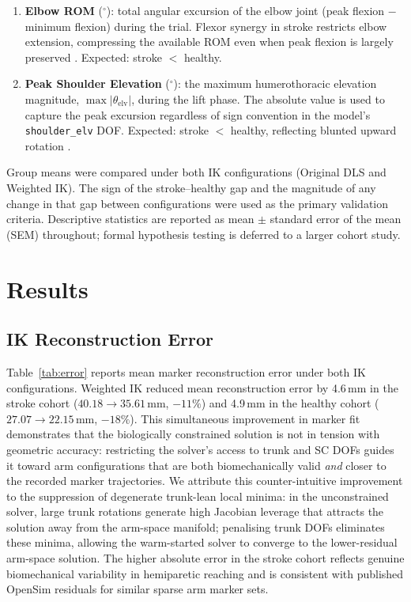 \documentclass[journal,10pt,twocolumn]{IEEEtran}
\begin{document}
\begin{enumerate}
  \item \textbf{Elbow ROM} ($^{\circ}$): total angular excursion of the
        elbow joint (peak flexion $-$ minimum flexion) during the trial.
        Flexor synergy in stroke restricts elbow extension, compressing
        the available ROM even when peak flexion is largely preserved
        \cite{dewald1995}.
        Expected: stroke $<$ healthy.

  \item \textbf{Peak Shoulder Elevation} ($^{\circ}$): the maximum
        humerothoracic elevation magnitude, $\max|\theta_{\text{elv}}|$,
        during the lift phase. The absolute value is used to capture the
        peak excursion regardless of sign convention in the model's
        \texttt{shoulder\_elv} DOF.
        Expected: stroke $<$ healthy, reflecting blunted upward rotation
        \cite{wagner2007}.
\end{enumerate}

Group means were compared under both IK configurations (Original DLS and
Weighted IK). The sign of the stroke--healthy gap and the magnitude of
any change in that gap between configurations were used as the primary
validation criteria.
Descriptive statistics are reported as mean $\pm$ standard error of the
mean (SEM) throughout; formal hypothesis testing is deferred to a larger
cohort study.

\section{Results}

\subsection{IK Reconstruction Error}

Table~\ref{tab:error} reports mean marker reconstruction error under both
IK configurations. Weighted IK reduced mean reconstruction error by
4.6\,mm in the stroke cohort ($40.18 \to 35.61$\,mm, $-11\%$) and
4.9\,mm in the healthy cohort ($27.07 \to 22.15$\,mm, $-18\%$).
This simultaneous improvement in marker fit demonstrates that the
biologically constrained solution is not in tension with geometric
accuracy: restricting the solver's access to trunk and SC DOFs guides
it toward arm configurations that are both biomechanically valid
\emph{and} closer to the recorded marker trajectories. We attribute this
counter-intuitive improvement to the suppression of degenerate trunk-lean
local minima: in the unconstrained solver, large trunk rotations generate
high Jacobian leverage that attracts the solution away from the arm-space
manifold; penalising trunk DOFs eliminates these minima, allowing the
warm-started solver to converge to the lower-residual arm-space solution. The higher
absolute error in the stroke cohort reflects genuine biomechanical
variability in hemiparetic reaching and is consistent with published
OpenSim residuals for similar sparse arm marker sets.
\end{document}

